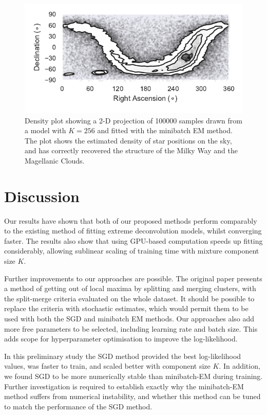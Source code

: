 \documentclass{article}
\begin{document}
\begin{figure}
  \centering
  \includegraphics{figures/density.pdf}
  \caption{Density plot showing a 2-D projection of 100000 samples drawn from a model with $K=256$ and fitted with the minibatch EM method.
  The plot shows the estimated density of star positions on the sky, and has correctly recovered the structure of the Milky Way and the Magellanic Clouds.}
  \label{fig:projection}
\end{figure}

\section{Discussion}

Our results have shown that both of our proposed methods perform comparably to the existing method of fitting extreme deconvolution models, whilst converging faster.
The results also show that using GPU-based computation speeds up fitting considerably, allowing sublinear scaling of training time with mixture component size $K$. 

Further improvements to our approaches are possible.
The original paper presents a method of getting out of local maxima by splitting and merging clusters, with the split-merge criteria evaluated on the whole dataset.
It should be possible to replace the criteria with stochastic estimates, which would permit them to be used with both the SGD and minibatch EM methods.
Our approaches also add more free parameters to be selected, including learning rate and batch size.
This adds scope for hyperparameter optimisation to improve the log-likelihood.

In this preliminary study the SGD method provided the best log-likelihood values, was faster to train, and scaled better with component size $K$.
In addition, we found SGD to be more numerically stable than minibatch-EM during training.
Further investigation is required to establish exactly why the minibatch-EM method suffers from numerical instability, and whether this method can be tuned to match the performance of the SGD method.
\end{document}
